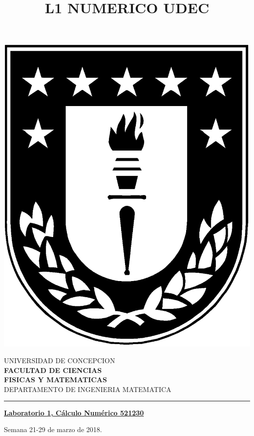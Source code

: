 \documentclass[11pt,legalpaper]{article}
\begin{document}
\title{L1 NUMERICO UDEC}


\begin{minipage}{0.12\textwidth}
\includegraphics[width=\textwidth]{logoudec.eps}
\end{minipage}
\hspace{5mm}
\begin{minipage}{0.9\textwidth}
UNIVERSIDAD DE CONCEPCION\\
{\small\small\bf 
FACULTAD DE CIENCIAS\\ 
FISICAS Y MATEMATICAS}\\
DEPARTAMENTO DE INGENIERIA MATEMATICA\\
\rule{0.80\textwidth}{.5pt} 
\end{minipage}
\vspace*{0.5cm} 

\centerline {\bf\underline{Laboratorio 1, C\'alculo Num\'erico 521230 }}
\centerline{\textrm{Semana 21-29 de marzo de 2018.}}  \vspace{0.2cm}


\end{document}

